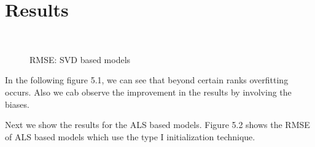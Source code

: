 \section{Results}
\begin{figure}[h!]
\centering
{}
\\
\label{fig:RMSE SVD}
\caption{RMSE: SVD based models}
\end{figure}

In the following figure 5.1, we can see that beyond certain ranks overfitting
occurs. Also we cab observe the improvement in the results by involving the
biases. 

Next we show the results for the ALS based models. Figure 5.2 shows the RMSE of
ALS based models which use the type I initialization technique. 


